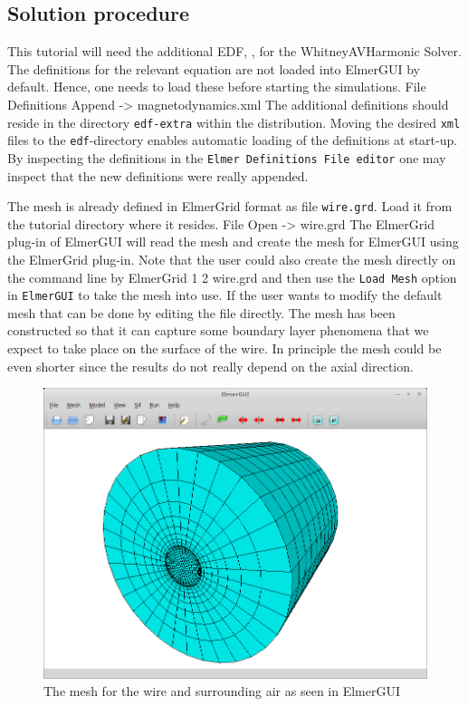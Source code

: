 \subsection*{Solution procedure}

This tutorial will need the additional EDF, \texttt{}, for the WhitneyAVHarmonic Solver.  The definitions for the relevant equation are not loaded into ElmerGUI by default. Hence, 
one needs to load these before starting the simulations.
\ttbegin
File 
  Definitions
    Append -> magnetodynamics.xml
\ttend
The additional definitions should reside in the directory \texttt{edf-extra} within the distribution.
Moving the desired \texttt{xml} files to the \texttt{edf}-directory enables automatic loading of the 
definitions at start-up. By inspecting the definitions in the \texttt{Elmer Definitions File editor} one
may inspect that the new definitions were really appended. 

The mesh is already defined in ElmerGrid format as file \texttt{wire.grd}. Load it from the tutorial directory where it resides.
\ttbegin
File 
  Open -> wire.grd
\ttend
The ElmerGrid plug-in of ElmerGUI will read the mesh and create the mesh for ElmerGUI using the ElmerGrid plug-in.
Note that the user
could also create the mesh directly on the command line by
\ttbegin
ElmerGrid 1 2 wire.grd
\ttend
and then use the \texttt{Load Mesh} option in \texttt{ElmerGUI} to take the mesh into use. 
If the user wants to modify the default mesh that can be done by editing the file directly.
The mesh has been constructed so that it can capture some boundary layer phenomena that we expect to take
place on the surface of the wire. In principle the mesh could be even shorter since the results do not really
depend on the axial direction. 


\begin{figure}[h]
\centering
\includegraphics[width=140mm]{WireElmerGUI}
\caption{The mesh for the wire and surrounding air as seen in ElmerGUI}\label{fg:WireElmerGUI}
\end{figure}  


